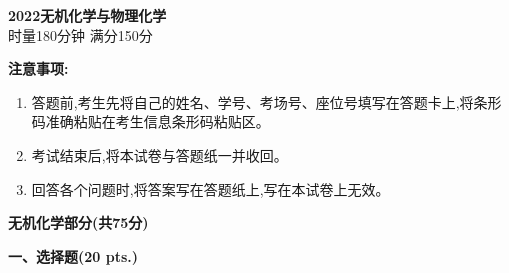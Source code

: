 \begin{center}
    {\LARGE \textbf{2022无机化学与物理化学}} \\[2ex]
    {\large 时量180分钟 \quad 满分150分}
\end{center}

\vspace{0.5cm}
\noindent\textbf{注意事项:}
\begin{enumerate}[label=\arabic*., parsep=0pt, itemsep=0pt]
    \item 答题前,考生先将自己的姓名、学号、考场号、座位号填写在答题卡上,将条形码准确粘贴在考生信息条形码粘贴区。
    \item 考试结束后,将本试卷与答题纸一并收回。
    \item 回答各个问题时,将答案写在答题纸上,写在本试卷上无效。
\end{enumerate}

\vspace{1cm}
\begin{center}
    {\Large \textbf{无机化学部分(共75分)}}
\end{center}

\noindent\textbf{一、选择题(20 pts.)}

